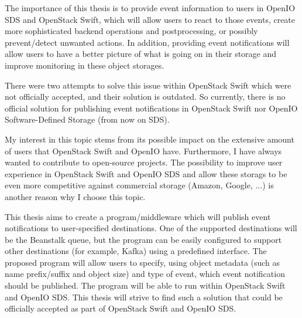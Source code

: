The importance of this thesis is to provide event information to users in OpenIO SDS and OpenStack Swift, which will allow users to react to those events, create more sophisticated backend operations and postprocessing, or possibly prevent/detect unwanted actions. In addition, providing event notifications will allow users to have a better picture of what is going on in their storage and improve monitoring in these object storages.

There were two attempts\cite{swiftPatch1}\cite{swiftPatch2} to solve this issue within OpenStack Swift which were not officially accepted, and their solution is outdated. So currently, there is no official solution for publishing event notifications in OpenStack Swift nor OpenIO Software-Defined Storage (from now on SDS).

My interest in this topic stems from its possible impact on the extensive amount of users that OpenStack Swift and OpenIO have. Furthermore, I have always wanted to contribute to open-source projects. The possibility to improve user experience in OpenStack Swift and OpenIO SDS and allow these storags to be even more competitive against commercial storage (Amazon, Google, ...) is another reason why I choose this topic.

This thesis aims to create a program/middleware which will publish event notifications to user-specified destinations. One of the supported destinations will be the Beanstalk queue, but the program can be easily configured to support other destinations (for example, Kafka) using a predefined interface. The proposed program will allow users to specify, using object metadata (such as name prefix/suffix and object size) and type of event, which event notification should be published. The program will be able to run within OpenStack Swift and OpenIO SDS. This thesis will strive to find such a solution that could be officially accepted as part of OpenStack Swift and OpenIO SDS.

